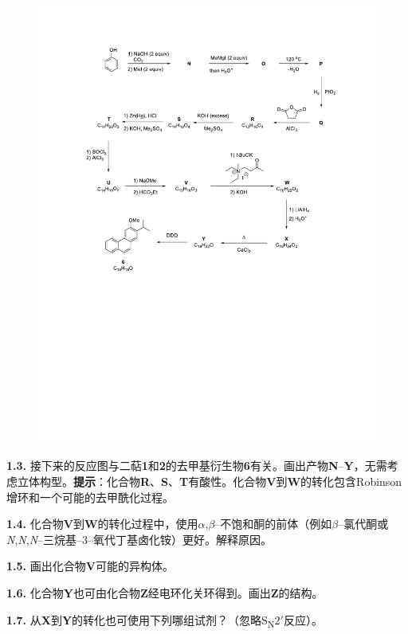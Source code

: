 \begin{figure}[h]
	\centering
	\includegraphics[width=15cm]{./pic/t1-4.pdf}
\end{figure}

\noindent\textbf{1.3.} 接下来的反应图与二萜\textbf{1}和\textbf{2}的去甲基衍生物\textbf{6}有关。画出产物\textbf{N}--\textbf{Y}，无需考虑立体构型。\textbf{提示}：化合物\textbf{R}、\textbf{S}、\textbf{T}有酸性。化合物\textbf{V}到\textbf{W}的转化包含Robinson增环和一个可能的去甲酰化过程。

\newpage\noindent\textbf{1.4.} 化合物\textbf{V}到\textbf{W}的转化过程中，使用$\alpha$,$\beta$--不饱和酮的前体（例如$\beta$--氯代酮或\emph{N},\emph{N},\emph{N}--三烷基--3--氧代丁基卤化铵）更好。解释原因。

\noindent\textbf{1.5.} 画出化合物\textbf{V}可能的异构体。

\noindent\textbf{1.6.} 化合物\textbf{Y}也可由化合物\textbf{Z}经电环化关环得到。画出\textbf{Z}的结构。

\noindent\textbf{1.7.} 从\textbf{X}到\textbf{Y}的转化也可使用下列哪组试剂？（忽略S\textsubscript{N}2$'$反应）。

